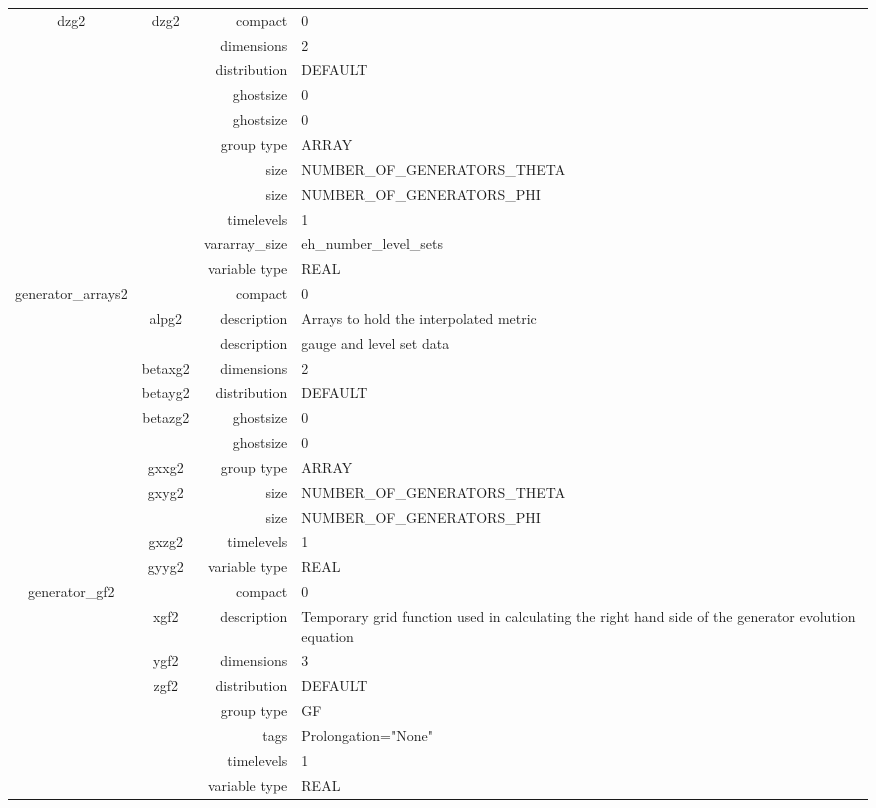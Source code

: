 \begin{tabular*}{150mm}{|c|c@{\extracolsep{\fill}}|rl|}
\hline 
dzg2 & dzg2 & compact & 0 \\ 
 &  & dimensions & 2 \\ 
 &  & distribution & DEFAULT \\ 
 &  & ghostsize & 0 \\ 
& ~ & ghostsize & 0 \\ 
 &  & group type & ARRAY \\ 
 &  & size & NUMBER\_OF\_GENERATORS\_THETA \\ 
& ~ & size & NUMBER\_OF\_GENERATORS\_PHI \\ 
 &  & timelevels & 1 \\ 
 &  & vararray\_size & eh\_number\_level\_sets \\ 
 &  & variable type & REAL \\ 
\hline 
generator\_arrays2 &  & compact & 0 \\ 
 & alpg2 & description & Arrays to hold the interpolated metric \\ 
& ~ & description &  gauge and level set data \\ 
 & betaxg2 & dimensions & 2 \\ 
 & betayg2 & distribution & DEFAULT \\ 
 & betazg2 & ghostsize & 0 \\ 
& ~ & ghostsize & 0 \\ 
 & gxxg2 & group type & ARRAY \\ 
 & gxyg2 & size & NUMBER\_OF\_GENERATORS\_THETA \\ 
& ~ & size & NUMBER\_OF\_GENERATORS\_PHI \\ 
 & gxzg2 & timelevels & 1 \\ 
 & gyyg2 & variable type & REAL \\ 
\hline 
generator\_gf2 &  & compact & 0 \\ 
 & xgf2 & description & Temporary grid function used in calculating the right hand side of the generator evolution equation \\ 
 & ygf2 & dimensions & 3 \\ 
 & zgf2 & distribution & DEFAULT \\ 
 &  & group type & GF \\ 
 &  & tags & Prolongation="None" \\ 
 &  & timelevels & 1 \\ 
 &  & variable type & REAL \\ 
\hline 
\end{tabular*} 



